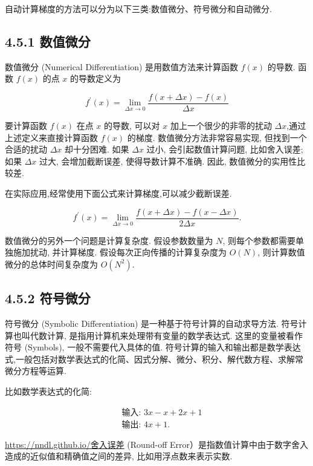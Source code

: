 \documentclass[10pt]{article}
\begin{document}
自动计算梯度的方法可以分为以下三类:数值微分、符号微分和自动微分.

\subsection*{4.5.1 数值微分}
数值微分 (Numerical Differentiation) 是用数值方法来计算函数 $f(x)$ 的导数. 函数 $f(x)$ 的点 $x$ 的导数定义为


\begin{equation*}
f^{\prime}(x)=\lim _{\Delta x \rightarrow 0} \frac{f(x+\Delta x)-f(x)}{\Delta x} \tag{4.70}
\end{equation*}


要计算函数 $f(x)$ 在点 $x$ 的导数, 可以对 $x$ 加上一个很少的非零的扰动 $\Delta x$,通过上述定义来直接计算函数 $f(x)$ 的梯度. 数值微分方法非常容易实现, 但找到一个合适的扰动 $\Delta x$ 却十分困难. 如果 $\Delta x$ 过小, 会引起数值计算问题, 比如舍入误差; 如果 $\Delta x$ 过大, 会增加截断误差, 使得导数计算不准确. 因此, 数值微分的实用性比较差.

在实际应用,经常使用下面公式来计算梯度,可以减少截断误差.


\begin{equation*}
f^{\prime}(x)=\lim _{\Delta x \rightarrow 0} \frac{f(x+\Delta x)-f(x-\Delta x)}{2 \Delta x} . \tag{4.71}
\end{equation*}


数值微分的另外一个问题是计算复杂度. 假设参数数量为 $N$, 则每个参数都需要单独施加扰动, 并计算梯度. 假设每次正向传播的计算复杂度为 $O(N)$, 则计算数值微分的总体时间复杂度为 $O\left(N^{2}\right)$.

\subsection*{4.5.2 符号微分}
符号微分 (Symbolic Differentiation) 是一种基于符号计算的自动求导方法. 符号计算也叫代数计算, 是指用计算机来处理带有变量的数学表达式. 这里的变量被看作符号 (Symbols), 一般不需要代入具体的值. 符号计算的输入和输出都是数学表达式,一般包括对数学表达式的化简、因式分解、微分、积分、解代数方程、求解常微分方程等运算.

比如数学表达式的化简:


\begin{align*}
& \text { 输入: } 3 x-x+2 x+1  \tag{4.72}\\
& \text { 输出: } 4 x+1 . \tag{4.73}
\end{align*}


\href{https://nndl.github.io/%E8%88%8D%E5%85%A5%E8%AF%AF%E5%B7%AE}{https://nndl.github.io/舍入误差} (Round-off Error）是指数值计算中由于数字舍入造成的近似值和精确值之间的差异, 比如用浮点数来表示实数.
\end{document}

